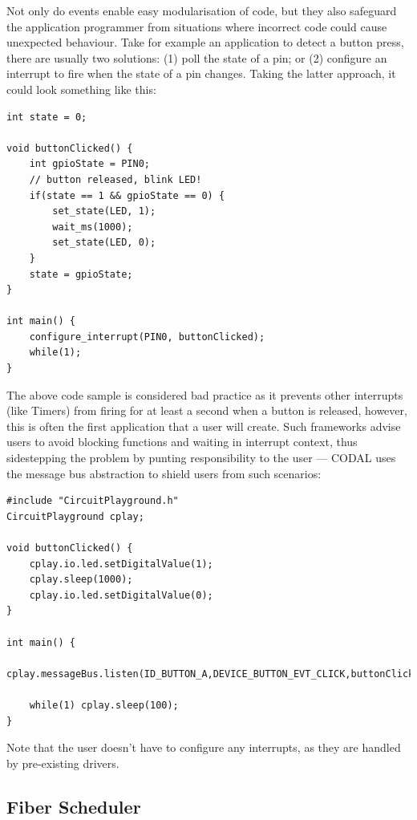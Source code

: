 Not only do events enable easy modularisation of code, but they also safeguard the application programmer from situations where incorrect code could cause unexpected behaviour. Take for example an application to detect a button press, there are usually two solutions: (1) poll the state of a pin; or (2) configure an interrupt to fire when the state of a pin changes. Taking the latter approach, it could look something like this:

\begin{lstlisting}
int state = 0;

void buttonClicked() {
    int gpioState = PIN0;
    // button released, blink LED!
    if(state == 1 && gpioState == 0) {
        set_state(LED, 1);
        wait_ms(1000);
        set_state(LED, 0);
    }
    state = gpioState;
}

int main() {
    configure_interrupt(PIN0, buttonClicked);
    while(1);
}
\end{lstlisting}

The above code sample is considered bad practice as it prevents other interrupts (like Timers) from firing for at least a second when a button is released, however, this is often the first application that a user will create. Such frameworks advise users to avoid blocking functions and waiting in interrupt context, thus sidestepping the problem by punting responsibility to the user --- CODAL uses the message bus abstraction to shield users from such scenarios:

\begin{lstlisting}
#include "CircuitPlayground.h"
CircuitPlayground cplay;

void buttonClicked() {
    cplay.io.led.setDigitalValue(1);
    cplay.sleep(1000);
    cplay.io.led.setDigitalValue(0);
}

int main() {
    cplay.messageBus.listen(ID_BUTTON_A,DEVICE_BUTTON_EVT_CLICK,buttonClicked);

    while(1) cplay.sleep(100);
}
\end{lstlisting}

Note that the user doesn't have to configure any interrupts, as they are handled by pre-existing drivers.


\subsection{Fiber Scheduler}

